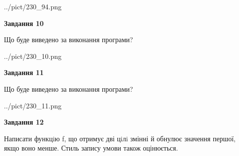 \documentclass[12pt, ukrainian]{article}
\begin{document}
{\begin {large}
\begin{center}
	{../pict/230_94.png}
\end{center}
\newpage

{\begin {center}\textbf{Завдання 10}\end {center}}

Що буде виведено за виконання програми?\par
\begin{center}
	{../pict/230_10.png}
\end{center}
\newpage

{\begin {center}\textbf{Завдання 11}\end {center}}

Що буде виведено за виконання програми?\par
\begin{center}
	{../pict/230_11.png}
\end{center}
\newpage

{\begin {center}\textbf{Завдання 12}\end {center}}


Написати функцiю f, що отримує дві цiлi змінні й обнулює значення першої, якщо воно менше. Стиль запису умови також оцінюється.\par
\newpage

\end {large}}
\end{document}
